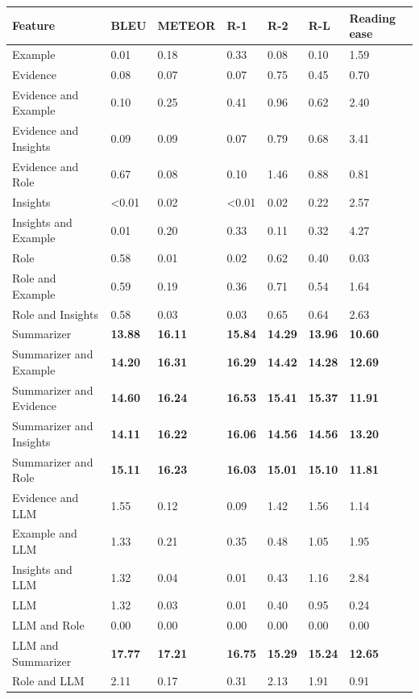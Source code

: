 \begin{tabular}{|l|l|l|l|l|l|l|}
\hline
\textbf{Feature} & BLEU & METEOR & R-1 & R-2 & R-L & Reading ease \\
 \hline
 Example & 0.01 & 0.18 & 0.33 & 0.08 & 0.10 & 1.59 \\
 \hline
 Evidence & 0.08 & 0.07 & 0.07 & 0.75 & 0.45 & 0.70 \\
 \hline
 Evidence and Example & 0.10 & 0.25 & 0.41 & 0.96 & 0.62 & 2.40 \\
 \hline
 Evidence and Insights & 0.09 & 0.09 & 0.07 & 0.79 & 0.68 & 3.41 \\
 \hline
 Evidence and Role & 0.67 & 0.08 & 0.10 & 1.46 & 0.88 & 0.81 \\
 \hline
 Insights & \textless{}0.01 & 0.02 & \textless{}0.01 & 0.02 & 0.22 & 2.57 \\
 \hline
 Insights and Example & 0.01 & 0.20 & 0.33 & 0.11 & 0.32 & 4.27 \\
 \hline
 Role & 0.58 & 0.01 & 0.02 & 0.62 & 0.40 & 0.03 \\
 \hline
 Role and Example & 0.59 & 0.19 & 0.36 & 0.71 & 0.54 & 1.64 \\
 \hline
 Role and Insights & 0.58 & 0.03 & 0.03 & 0.65 & 0.64 & 2.63 \\
 \hline
 Summarizer & \textbf{13.88} & \textbf{16.11} & \textbf{15.84} & \textbf{14.29} & \textbf{13.96} & \textbf{10.60} \\
 \hline
 Summarizer and Example & \textbf{14.20} & \textbf{16.31} & \textbf{16.29} & \textbf{14.42} & \textbf{14.28} & \textbf{12.69} \\
 \hline
 Summarizer and Evidence & \textbf{14.60} & \textbf{16.24} & \textbf{16.53} & \textbf{15.41} & \textbf{15.37} & \textbf{11.91} \\
 \hline
 Summarizer and Insights & \textbf{14.11} & \textbf{16.22} & \textbf{16.06} & \textbf{14.56} & \textbf{14.56} & \textbf{13.20} \\
 \hline
 Summarizer and Role & \textbf{15.11} & \textbf{16.23} & \textbf{16.03} & \textbf{15.01} & \textbf{15.10} & \textbf{11.81} \\
 \hline
 Evidence and LLM & 1.55 & 0.12 & 0.09 & 1.42 & 1.56 & 1.14 \\
 \hline
 Example and LLM & 1.33 & 0.21 & 0.35 & 0.48 & 1.05 & 1.95 \\
 \hline
 Insights and LLM & 1.32 & 0.04 & 0.01 & 0.43 & 1.16 & 2.84 \\
 \hline
 LLM & 1.32 & 0.03 & 0.01 & 0.40 & 0.95 & 0.24 \\
 \hline
 LLM and Role & 0.00 & 0.00 & 0.00 & 0.00 & 0.00 & 0.00 \\
 \hline
 LLM and Summarizer & \textbf{17.77} & \textbf{17.21} & \textbf{16.75} & \textbf{15.29} & \textbf{15.24} & \textbf{12.65} \\
 \hline
 Role and LLM & 2.11 & 0.17 & 0.31 & 2.13 & 1.91 & 0.91 \\
\hline
\end{tabular}
